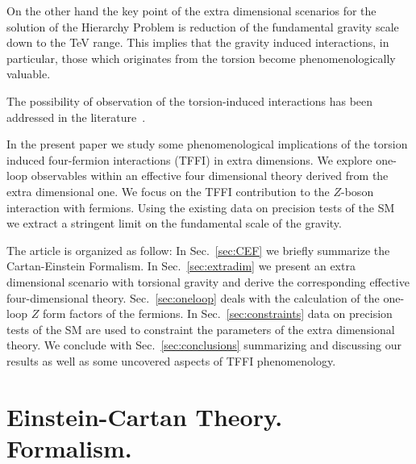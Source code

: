 \documentclass[twocolumn,showpacs,showkeys,prd,superscriptaddress]{revtex4-1}
\begin{document}
On the other hand the key point of the extra dimensional scenarios  \cite{ArkaniHamed:1998rs,Antoniadis:1998ig,ArkaniHamed:1998nn,Randall:1999ee,Randall:1999vf} for the solution of the Hierarchy Problem is reduction of the fundamental gravity scale down to the \si{\TeV} range.  This implies that the gravity induced  interactions, in particular, those which originates from the torsion become phenomenologically valuable.


The possibility of observation of the torsion-induced interactions has been addressed in the literature~\cite{Belyaev:1998ax,CastilloFelisola:2012fy,Lebedev:2002dp,Kostelecky:2007kx}.


In the present paper we study some phenomenological implications of the torsion induced four-fermion interactions (TFFI) in extra dimensions.
We explore one-loop observables within an effective four dimensional theory derived from the extra dimensional one. We focus on the TFFI contribution to the  $Z$-boson interaction with fermions. Using the existing data on precision tests of the SM~\cite{Altarelli:2004fq,Beringer:1900zz} we extract a stringent limit on the fundamental scale of the gravity. 

The article is organized as follow: In Sec.~\ref{sec:CEF}  we briefly summarize the Cartan-Einstein Formalism. In Sec.~\ref{sec:extradim}  we present an extra dimensional scenario with torsional gravity and derive the corresponding effective four-dimensional theory. Sec.~\ref{sec:oneloop} deals with the calculation of the one-loop $Z$ form factors of the fermions. In Sec.~\ref{sec:constraints} data on precision tests of the SM are used to constraint the parameters of the extra dimensional theory. We conclude with Sec.~\ref{sec:conclusions} summarizing and discussing our results as well as some uncovered aspects of TFFI phenomenology.


\section{\label{sec:CEF} Einstein-Cartan Theory. Formalism.}
\end{document}
